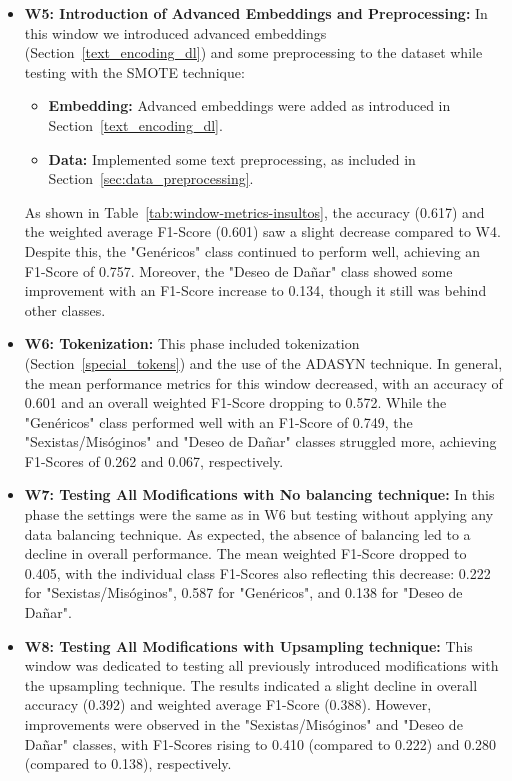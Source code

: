 \begin{itemize}
    
    \item \textbf{W5: Introduction of Advanced Embeddings and Preprocessing:} In this window we introduced advanced embeddings (Section~\ref{text_encoding_dl}) and some preprocessing to the dataset while testing with the SMOTE technique:
        \begin{itemize}
            \item \textbf{Embedding:} Advanced embeddings were added as introduced in Section~\ref{text_encoding_dl}.
            \item \textbf{Data:} Implemented some text preprocessing, as included in Section~\ref{sec:data_preprocessing}.
        \end{itemize}
    As shown in Table~\ref{tab:window-metrics-insultos}, the accuracy (0.617) and the weighted average F1-Score (0.601) saw a slight decrease compared to W4. Despite this, the "Genéricos" class continued to perform well, achieving an F1-Score of 0.757. Moreover, the "Deseo de Dañar" class showed some improvement with an F1-Score increase to 0.134, though it still was behind other classes.


    \item \textbf{W6: Tokenization:} This phase included tokenization (Section~\ref{special_tokens}) and the use of the ADASYN technique. In general, the mean performance metrics for this window decreased, with an accuracy of 0.601 and an overall weighted F1-Score dropping to 0.572. While the "Genéricos" class performed well with an F1-Score of 0.749, the "Sexistas/Misóginos" and "Deseo de Dañar" classes struggled more, achieving F1-Scores of 0.262 and 0.067, respectively.

    \newpage
    
    \item \textbf{W7: Testing All Modifications with No balancing technique:} In this phase the settings were the same as in W6 but testing without applying any data balancing technique. As expected, the absence of balancing led to a decline in overall performance. The mean weighted F1-Score dropped to 0.405, with the individual class F1-Scores also reflecting this decrease: 0.222 for "Sexistas/Misóginos", 0.587 for "Genéricos", and 0.138 for "Deseo de Dañar". 
    

    \item \textbf{W8: Testing All Modifications with Upsampling technique:} This window was dedicated to testing all previously introduced modifications with the upsampling technique. The results indicated a slight decline in overall accuracy (0.392) and weighted average F1-Score (0.388). However, improvements were observed in the "Sexistas/Misóginos" and "Deseo de Dañar" classes, with F1-Scores rising to 0.410 (compared to 0.222) and 0.280 (compared to 0.138), respectively. 



\end{itemize}

